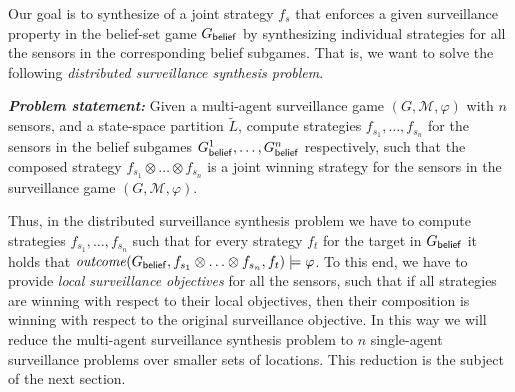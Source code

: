 Our goal is to synthesize of a joint strategy $f_s$ that enforces a given surveillance property in the belief-set game $G_{\mathsf{belief}}$ by synthesizing individual strategies for all the sensors in the corresponding belief subgames. That is, we want to solve the following \emph{distributed surveillance synthesis problem}. 
 
{\textit{\textbf{Problem statement: }}}Given a multi-agent surveillance game $(G,\mathcal M,\varphi)$ with $n$ sensors, and a state-space partition $\widetilde{L}$, compute strategies $f_{s_1},\ldots,f_{s_n}$ for the sensors in the belief subgames $G^1_{\mathsf{belief}},\ldots,G^n_{\mathsf{belief}}$ respectively, such that the composed strategy $f_{s_1}\otimes\ldots\otimes f_{s_n}$ is a joint winning strategy for the sensors in the surveillance game $(G,\mathcal M,\varphi)$.

\smallskip

Thus, in the distributed surveillance synthesis problem we have to compute strategies $f_{s_1},\ldots,f_{s_n}$  such that for every strategy $f_t$ for the target in $G_{\mathsf{belief}}$ it holds that $\mathit{outcome}(G_{\mathsf{belief}},f_{s_1}\otimes\ldots\otimes f_{s_n},f_{t}) \models \varphi$. To this end, we have to provide \emph{local surveillance objectives} for all the sensors, such that if all strategies are winning with respect to their local objectives, then their composition is winning with respect to the original surveillance objective. In this way we will reduce the multi-agent surveillance synthesis problem to $n$ single-agent surveillance problems over smaller sets of locations. This reduction is the subject of the next section.



